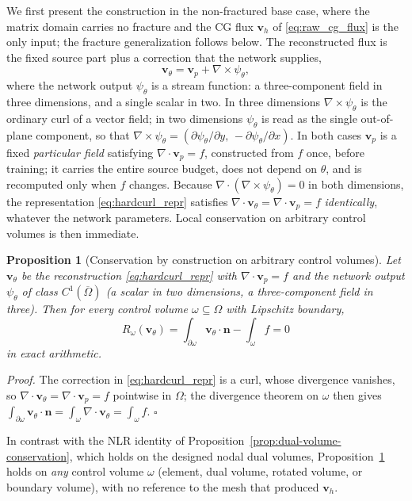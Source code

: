 \documentclass[a4paper,fleqn]{cas-sc}
\newcommand{\vflux}{\mathbf{v}}
\newcommand{\curl}{\nabla\times}          %
\newcommand{\vp}{\vflux_{p}}              %
\newtheorem{proposition}[theorem]{Proposition}
\begin{document}
We first present the construction in the non-fractured base case, where the
matrix domain carries no fracture and the CG flux \(\vflux_h\) of
\eqref{eq:raw_cg_flux} is the only input; the fracture generalization follows
below. The reconstructed flux is the fixed source part plus a correction that the
network supplies,
\begin{equation}
  \vflux_\theta = \vp + \curl\psi_\theta ,
  \label{eq:hardcurl_repr}
\end{equation}
where the network output \(\psi_\theta\) is a stream function: a three-component
field in three dimensions, and a single scalar in two. In three dimensions
\(\curl\psi_\theta\) is the ordinary curl of a vector field; in two dimensions
\(\psi_\theta\) is read as the single out-of-plane component, so that
\(\curl\psi_\theta=(\partial\psi_\theta/\partial y,\,
-\partial\psi_\theta/\partial x)\). In both cases \(\vp\) is a fixed
\emph{particular field} satisfying \(\nabla\cdot\vp=f\), constructed from \(f\)
once, before training; it carries the entire source budget, does not depend on
\(\theta\), and is recomputed only when \(f\) changes. Because
\(\nabla\cdot(\curl\psi_\theta)=0\) in both dimensions, the representation
\eqref{eq:hardcurl_repr} satisfies \(\nabla\cdot\vflux_\theta=\nabla\cdot\vp=f\)
\emph{identically}, whatever the network parameters. Local conservation on
arbitrary control volumes is then immediate.

\begin{proposition}[Conservation by construction on arbitrary control volumes]
\label{prop:hardcurl-conservation}
Let \(\vflux_\theta\) be the reconstruction \eqref{eq:hardcurl_repr} with
\(\nabla\cdot\vp=f\) and the network output \(\psi_\theta\) of class
\(C^1(\overline\Omega)\) (a scalar in two dimensions, a three-component field in
three). Then for every control volume \(\omega\subseteq\Omega\) with Lipschitz
boundary,
\[
  R_\omega(\vflux_\theta)
  =
  \int_{\partial\omega}\vflux_\theta\cdot\mathbf{n}
  -
  \int_\omega f
  =
  0
\]
in exact arithmetic.
\end{proposition}

\noindent\emph{Proof.}
The correction in \eqref{eq:hardcurl_repr} is a curl, whose divergence vanishes,
so \(\nabla\cdot\vflux_\theta=\nabla\cdot\vp=f\) pointwise in \(\Omega\); the
divergence theorem on \(\omega\) then gives
\(\int_{\partial\omega}\vflux_\theta\cdot\mathbf{n}
=\int_\omega\nabla\cdot\vflux_\theta
=\int_\omega f\). \(\square\)

In contrast with the NLR identity of
Proposition~\ref{prop:dual-volume-conservation}, which holds on the designed
nodal dual volumes, Proposition~\ref{prop:hardcurl-conservation} holds on
\emph{any} control volume \(\omega\) (element, dual volume, rotated volume, or
boundary volume), with no reference to the mesh that produced \(\vflux_h\).
\end{document}
